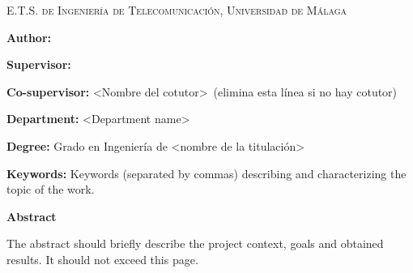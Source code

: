 
\pagestyle{fancy}

\begin{center}
	\scshape
	E.T.S. de Ingeniería de Telecomunicación, Universidad de Málaga
\end{center}

\bigskip

\begin{center}
	\Large \scshape
	\textbf{\tfgtitlenameENG}
\end{center}

\bigskip \bigskip \bigskip

\begin{minipage}{\textwidth}

\textbf{Author:} \tfgauthorname

\medskip

\textbf{Supervisor:} \tfgtutorname

\medskip

\textbf{Co-supervisor:} <Nombre del cotutor>\ (elimina esta línea si no hay cotutor)

\medskip

\textbf{Department:} <Department name>

\medskip

\textbf{Degree:} Grado en Ingeniería de <nombre de la titulación>

\medskip

\textbf{Keywords:} Keywords (separated by commas) describing and characterizing the topic of the work.

\bigskip \bigskip


\end{minipage}

\begin{center}
	\textbf{Abstract}
\end{center}

The abstract should briefly describe the project context, goals and
obtained results. It should not exceed this page.

\blankpage
